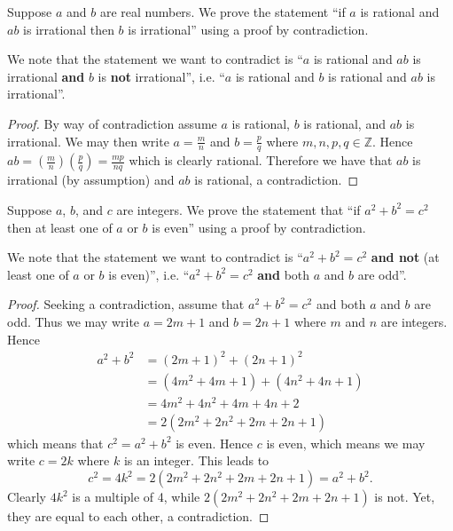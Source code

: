 \begin{example}
    Suppose $a$ and $b$ are real numbers. We prove the statement ``if $a$ is rational and $ab$ is irrational then $b$ is irrational'' using a proof by contradiction.
    
    We note that the statement we want to contradict is ``$a$ is rational and $ab$ is irrational \textbf{and} $b$ is \textbf{not} irrational'', i.e. ``$a$ is rational and $b$ is rational and $ab$ is irrational''.
    \begin{proof}
        By way of contradiction assume $a$ is rational, $b$ is rational, and $ab$ is irrational. We may then write $a = \frac mn$ and $b = \frac pq$ where $m, n, p, q \in \mathbb{Z}$. Hence $ab = \left(\frac mn\right)\left(\frac pq\right) = \frac{mp}{nq}$ which is clearly rational. Therefore we have that $ab$ is irrational (by assumption) and $ab$ is rational, a contradiction.
    \end{proof}
\end{example}

\begin{example}
    Suppose $a$, $b$, and $c$ are integers. We prove the statement that ``if $a^2 + b^2 = c^2$ then at least one of $a$ or $b$ is even'' using a proof by contradiction.
    
    We note that the statement we want to contradict is ``$a^2 + b^2 = c^2$ \textbf{and not} (at least one of $a$ or $b$ is even)'', i.e. ``$a^2 + b^2 = c^2$ \textbf{and} both $a$ and $b$ are odd''.
    \begin{proof}
        Seeking a contradiction, assume that $a^2 + b^2 = c^2$ and both $a$ and $b$ are odd. Thus we may write $a = 2m + 1$ and $b = 2n + 1$ where $m$ and $n$ are integers. Hence
        \begin{align*}
            a^2 + b^2 &= (2m+1)^2 + (2n+1)^2\\
            &= (4m^2+4m+1) + (4n^2+4n+1)\\
            &= 4m^2 + 4n^2 + 4m + 4n + 2\\
            &= 2(2m^2 + 2n^2 + 2m + 2n +1)
        \end{align*}
        which means that $c^2 = a^2 + b^2$ is even. Hence $c$ is even, which means we may write $c = 2k$ where $k$ is an integer. This leads to
        \[
            c^2 = 4k^2 = 2(2m^2 + 2n^2 + 2m + 2n + 1) = a^2 + b^2.
        \]
        Clearly $4k^2$ is a multiple of 4, while $2(2m^2 + 2n^2 + 2m + 2n + 1)$ is not. Yet, they are equal to each other, a contradiction.
    \end{proof}
\end{example}

